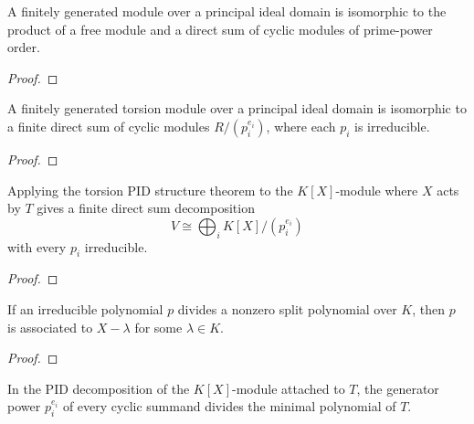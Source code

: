 \begin{theorem}
  \label{thm:fg_module_pid_structure}
  \leanok
  A finitely generated module over a principal ideal domain is isomorphic to
  the product of a free module and a direct sum of cyclic modules of prime-power
  order.
\end{theorem}

\begin{proof}
  \leanok
\end{proof}

\begin{theorem}
  \label{thm:fg_torsion_module_pid_structure}
  \leanok
  A finitely generated torsion module over a principal ideal domain is
  isomorphic to a finite direct sum of cyclic modules
  \(R/(p_i^{e_i})\), where each \(p_i\) is irreducible.
\end{theorem}

\begin{proof}
  \leanok
\end{proof}

\begin{theorem}
  \label{thm:pid_decomposition_aeval}
  \leanok
  Applying the torsion PID structure theorem to the \(K[X]\)-module where
  \(X\) acts by \(T\) gives a finite direct sum decomposition
  \[
    V \cong \bigoplus_i K[X]/(p_i^{e_i})
  \]
  with every \(p_i\) irreducible.
\end{theorem}

\begin{proof}
  \leanok
\end{proof}

\begin{theorem}
  \label{thm:irreducible_split_factor_linear}
  \leanok
  If an irreducible polynomial \(p\) divides a nonzero split polynomial over
  \(K\), then \(p\) is associated to \(X-\lambda\) for some
  \(\lambda\in K\).
\end{theorem}

\begin{proof}
  \leanok
\end{proof}

\begin{theorem}
  \label{thm:pid_summand_divides_minpoly}
  \leanok
  In the PID decomposition of the \(K[X]\)-module attached to \(T\), the
  generator power \(p_i^{e_i}\) of every cyclic summand divides the minimal
  polynomial of \(T\).
\end{theorem}

